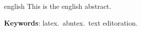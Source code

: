 \begin{resumo}[Abstract]
	\begin{otherlanguage*}{english}
		This is the english abstract.

		\vspace{\onelineskip}

		\noindent
		\textbf{Keywords}: latex.\ abntex.\ text editoration.
	\end{otherlanguage*}
\end{resumo}